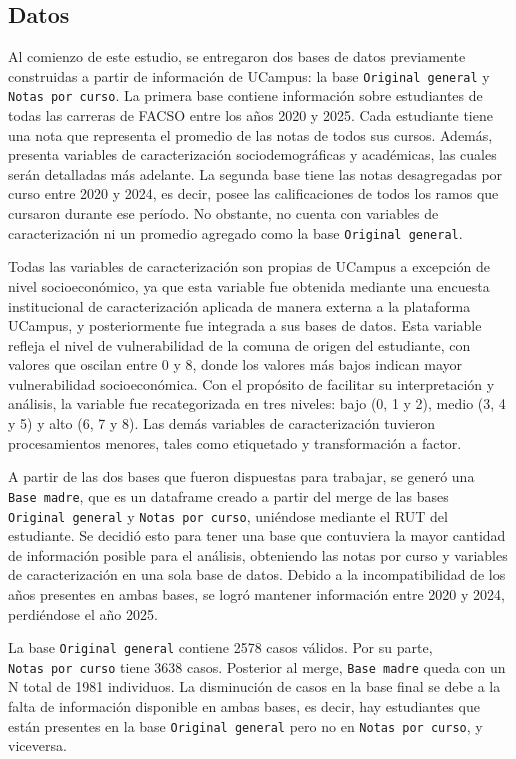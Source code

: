 \documentclass[
  spanish,
  a4paper,
  oneside]{scrbook}
\begin{document}
\subsection{Datos}\label{datos}

Al comienzo de este estudio, se entregaron dos bases de datos
previamente construidas a partir de información de UCampus: la base
\texttt{Original\ general} y \texttt{Notas\ por\ curso}. La primera base
contiene información sobre estudiantes de todas las carreras de FACSO
entre los años 2020 y 2025. Cada estudiante tiene una nota que
representa el promedio de las notas de todos sus cursos. Además,
presenta variables de caracterización sociodemográficas y académicas,
las cuales serán detalladas más adelante. La segunda base tiene las
notas desagregadas por curso entre 2020 y 2024, es decir, posee las
calificaciones de todos los ramos que cursaron durante ese período. No
obstante, no cuenta con variables de caracterización ni un promedio
agregado como la base \texttt{Original\ general}.

Todas las variables de caracterización son propias de UCampus a
excepción de nivel socioeconómico, ya que esta variable fue obtenida
mediante una encuesta institucional de caracterización aplicada de
manera externa a la plataforma UCampus, y posteriormente fue integrada a
sus bases de datos. Esta variable refleja el nivel de vulnerabilidad de
la comuna de origen del estudiante, con valores que oscilan entre 0 y 8,
donde los valores más bajos indican mayor vulnerabilidad socioeconómica.
Con el propósito de facilitar su interpretación y análisis, la variable
fue recategorizada en tres niveles: bajo (0, 1 y 2), medio (3, 4 y 5) y
alto (6, 7 y 8). Las demás variables de caracterización tuvieron
procesamientos menores, tales como etiquetado y transformación a factor.

A partir de las dos bases que fueron dispuestas para trabajar, se generó
una \texttt{Base\ madre}, que es un dataframe creado a partir del merge
de las bases \texttt{Original\ general} y \texttt{Notas\ por\ curso},
uniéndose mediante el RUT del estudiante. Se decidió esto para tener una
base que contuviera la mayor cantidad de información posible para el
análisis, obteniendo las notas por curso y variables de caracterización
en una sola base de datos. Debido a la incompatibilidad de los años
presentes en ambas bases, se logró mantener información entre 2020 y
2024, perdiéndose el año 2025.

La base \texttt{Original\ general} contiene 2578 casos válidos. Por su
parte, \texttt{Notas\ por\ curso} tiene 3638 casos. Posterior al merge,
\texttt{Base\ madre} queda con un N total de 1981 individuos. La
disminución de casos en la base final se debe a la falta de información
disponible en ambas bases, es decir, hay estudiantes que están presentes
en la base \texttt{Original\ general} pero no en
\texttt{Notas\ por\ curso}, y viceversa.
\end{document}
